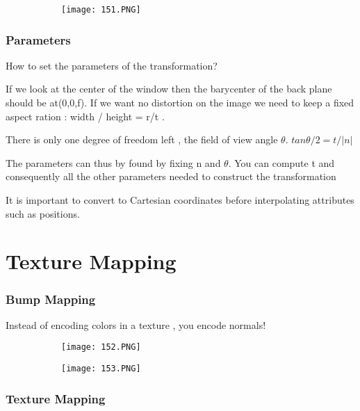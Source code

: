 \documentclass{article}
\begin{document}
\begin{figure}[ht!]
  \centering
  \begin{subfigure}[b]{0.6\linewidth}
    \texttt{[image: 151.PNG]}
  \end{subfigure}
\end{figure}


\subsubsection{Parameters}

How to set the parameters of the transformation?

If we look at the center of the window then the barycenter of the back plane should be at(0,0,f).
If we want no distortion on the image we need to keep a fixed aspect ration : width / height = r/t .

There is only one degree of freedom left , the field of view angle $\theta$. $tan \theta/2 = t / |n|$

The parameters can thus by found by fixing n and $\theta$. You can compute t and consequently all the other parameters needed to construct the transformation

It is important to convert to Cartesian coordinates before interpolating attributes such as positions.

\section{Texture Mapping}

\subsubsection{Bump Mapping}

Instead of encoding colors in a texture , you encode normals!

\begin{figure}[ht!]
  \centering
  \begin{subfigure}[b]{0.3\linewidth}
    \texttt{[image: 152.PNG]}
  \end{subfigure}
  \begin{subfigure}[b]{0.3\textwidth}
         \centering
         \texttt{[image: 153.PNG]}
     \end{subfigure}
\end{figure}

\subsubsection{Texture Mapping}
\end{document}
